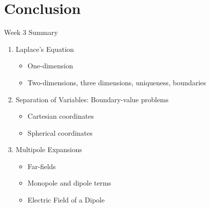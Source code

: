 \documentclass{beamer}
\begin{document}
\section{Conclusion}

\begin{frame}{Week 3 Summary}
\begin{enumerate}
\item Laplace's Equation
\begin{itemize}
\item One-dimension
\item Two-dimensions, three dimensions, uniqueness, boundaries
\end{itemize}
\item Separation of Variables: Boundary-value problems
\begin{itemize}
\item Cartesian coordinates
\item Spherical coordinates
\end{itemize}
\item Multipole Expansions
\begin{itemize}
\item Far-fields
\item Monopole and dipole terms
\item Electric Field of a Dipole
\end{itemize}
\end{enumerate}
\end{frame}
\end{document}
